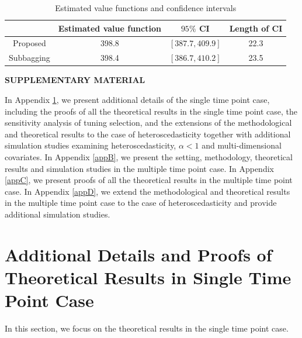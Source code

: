 \documentclass[11pt]{article}
\theoremstyle{referenceplain}
\theoremstyle{referencedefinition}
\theoremstyle{referenceremark}
\begin{document}
\begin{table}[H]
    \centering
    \scriptsize
        \caption{Estimated value functions and confidence intervals}
    \label{real}
   \begin{tabular}{cccc}
\hline & Estimated value function & $95 \%$ CI & Length of CI \\
\hline Proposed & 398.8 & {$[387.7,409.9]$} & 22.3 \\
\hline Subbagging & 398.4 & {$[386.7,410.2]$} & 23.5 \\
\hline
\end{tabular}
\end{table}





\clearpage
\begin{center}
{\LARGE\bfseries SUPPLEMENTARY MATERIAL}
\end{center}
In Appendix \ref{appA}, we present additional details of the single time point case, including the proofs of all the theoretical results in the single time point case, the sensitivity 
analysis of tuning selection, and the extensions of the methodological and theoretical results to the case of heteroscedasticity together with 
additional simulation studies examining heteroscedasticity, $\alpha < 1$ and multi-dimensional covariates. In Appendix \ref{appB}, 
we present the setting, methodology, theoretical results and simulation studies in the multiple time point case. In Appendix \ref{appC}, we 
present proofs of all the theoretical results in the multiple time point case. In Appendix \ref{appD}, we extend the methodological and 
theoretical results in the multiple time point case to the case of heteroscedasticity and provide additional simulation studies.


\appendix
{}
\setcounter{equation}{25}
\section{Additional Details and Proofs of Theoretical Results in Single Time Point Case}\label{appA}
In this section, we focus on the theoretical results in the single time point case.
\end{document}

